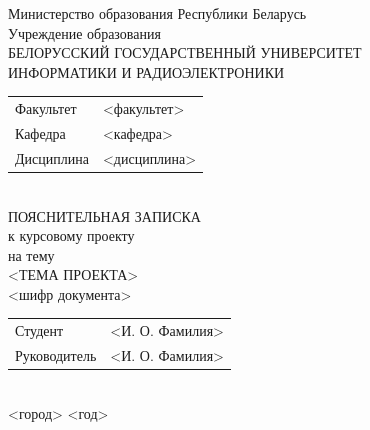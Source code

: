 \begin{titlepage}
  \begin{center}
    Министерство образования Республики Беларусь\\[1em]
    Учреждение образования\\
    БЕЛОРУССКИЙ ГОСУДАРСТВЕННЫЙ УНИВЕРСИТЕТ \\
    ИНФОРМАТИКИ И РАДИОЭЛЕКТРОНИКИ\\[1em]

    \begin{minipage}{\textwidth}
      \begin{flushleft}
        \begin{tabular}{ l l }
          Факультет & <факультет>\\
          Кафедра & <кафедра>\\
          Дисциплина & <дисциплина>
        \end{tabular}
      \end{flushleft}
    \end{minipage}\\[1em]

    \vfill
    {ПОЯСНИТЕЛЬНАЯ ЗАПИСКА}\\
    {к курсовому проекту}\\
    {на тему}\\[1em]
    \MakeUppercase{<тема проекта>}\\[1em]
    {<шифр документа>}\\
        \vfill
    \begin{tabular}{ p{}p{} }
      Студент & <И. О. Фамилия> \\
      Руководитель & <И. О. Фамилия> \\
    \end{tabular}
    \\[5em]
    {\normalsize <город> <год>}
  \end{center}
\end{titlepage}
